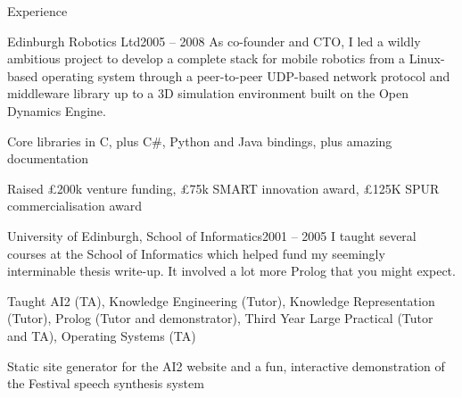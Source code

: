 \documentclass{resume} %
\begin{document}
\begin{rSection}{Experience}

\begin{rSubsection}{Edinburgh Robotics Ltd}{2005 -- 2008}
{As co-founder and CTO, I led a wildly ambitious project to develop a complete stack for mobile robotics from a Linux-based operating system through a peer-to-peer UDP-based network protocol and middleware library up to a 3D simulation environment built on the Open Dynamics Engine.}{}
\item Core libraries in C, plus C\#, Python and Java bindings, plus amazing documentation
\item Raised £200k venture funding, £75k SMART innovation award, £125K SPUR commercialisation award
\end{rSubsection}

\begin{rSubsection}{University of Edinburgh, School of Informatics}{2001 -- 2005}
{I taught several courses at the School of Informatics which helped fund my seemingly interminable thesis write-up. It involved a lot more Prolog that you might expect.}{}
\item Taught AI2 (TA), Knowledge Engineering (Tutor), Knowledge Representation (Tutor), Prolog (Tutor and demonstrator), Third Year Large Practical (Tutor and TA), Operating Systems (TA)
\item Static site generator for the AI2 website and a fun, interactive demonstration of the Festival speech synthesis system
\end{rSubsection}

\end{rSection}




\end{document}
